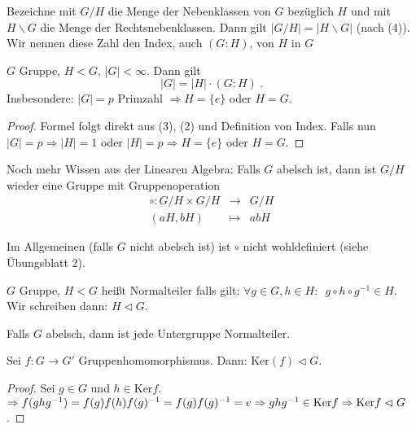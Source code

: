 \documentclass[12pt,a4paper]{scrartcl}
\begin{document}
\begin{defi}
	Bezeichne mit $G/H$ die Menge der Nebenklassen von $G$ bezüglich $H$ und mit $ H\backslash G$ die Menge der Rechtsnebenklassen. Dann gilt $|G/H| = |H\backslash G|$ (nach (4)). Wir nennen diese Zahl den Index, auch $(G:H)$, von $H$ in $G$
\end{defi}

\begin{satz} \label{thm:lagrange}
	$G$ Gruppe, $H<G$, $|G|<\infty$. Dann gilt
	$$ |G| = |H|\cdot (G:H)\ .$$
	Insbesondere: $|G| = p$ Primzahl $\Rightarrow H = \{e\}$ oder $H = G$.
\end{satz}

\begin{proof}
	Formel folgt direkt aus (3), (2) und Definition von Index.
	Falls nun $|G| = p \Rightarrow |H| = 1$ oder $|H| = p\Rightarrow H = \{e\}$ oder $H = G$.
\end{proof}

\noindent Noch mehr Wissen aus der Linearen Algebra: Falls $G$ abelsch ist, dann ist $G/H$ wieder eine Gruppe mit Gruppenoperation
\begin{eqnarray*}
	\circ \colon G/H\times G/H &\to& G/H\\
	(aH,bH)&\mapsto& abH
\end{eqnarray*}

Im Allgemeinen (falls $G$ nicht abelsch ist) ist $\circ$ nicht wohldefiniert (siehe Übungsblatt 2).

\begin{defi}
	$G$ Gruppe, $H<G$ heißt Normalteiler falls gilt: $\forall g\in G, h\in H:\enspace g\circ h\circ g^{-1}\in H$. Wir schreiben dann: $H\vartriangleleft G$.
\end{defi}
\begin{bem}
	Falls $G$ abelsch, dann ist jede Untergruppe Normalteiler.
\end{bem}

\begin{lem}
	Sei $f\colon G\to G'$ Gruppenhomomorphismus.  Dann: $\text{Ker}(f)\vartriangleleft G$.
\end{lem}
\begin{proof}
	Sei $g\in G$ und $h\in \text{Ker}f$. $\Rightarrow f(ghg^{-1}) = f(g)f(h)f(g)^{-1} = \\f(g)f(g)^{-1} = e \Rightarrow ghg^{-1}\in \text{Ker}f\Rightarrow \text{Ker}f\vartriangleleft G$.
\end{proof}
\end{document}
